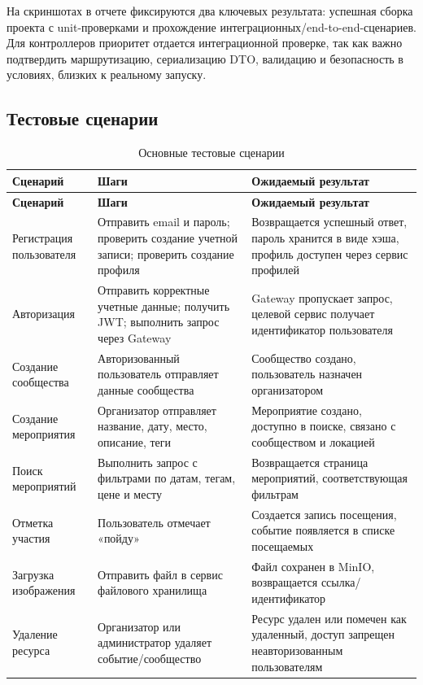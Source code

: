 На скриншотах в отчете фиксируются два ключевых результата: успешная сборка проекта с unit-проверками и прохождение интеграционных/end-to-end-сценариев. Для контроллеров приоритет отдается интеграционной проверке, так как важно подтвердить маршрутизацию, сериализацию DTO, валидацию и безопасность в условиях, близких к реальному запуску.

\subsection{Тестовые сценарии}

\begin{longtable}{|p{4cm}|p{5.5cm}|p{5.5cm}|}
\caption{Основные тестовые сценарии}\label{tab:tests}\\
\hline
\textbf{Сценарий} & \textbf{Шаги} & \textbf{Ожидаемый результат} \\
\hline
\endfirsthead
\hline
\textbf{Сценарий} & \textbf{Шаги} & \textbf{Ожидаемый результат} \\
\hline
\endhead
Регистрация пользователя & Отправить email и пароль; проверить создание учетной записи; проверить создание профиля & Возвращается успешный ответ, пароль хранится в виде хэша, профиль доступен через сервис профилей \\
\hline
Авторизация & Отправить корректные учетные данные; получить JWT; выполнить запрос через Gateway & Gateway пропускает запрос, целевой сервис получает идентификатор пользователя \\
\hline
Создание сообщества & Авторизованный пользователь отправляет данные сообщества & Сообщество создано, пользователь назначен организатором \\
\hline
Создание мероприятия & Организатор отправляет название, дату, место, описание, теги & Мероприятие создано, доступно в поиске, связано с сообществом и локацией \\
\hline
Поиск мероприятий & Выполнить запрос с фильтрами по датам, тегам, цене и месту & Возвращается страница мероприятий, соответствующая фильтрам \\
\hline
Отметка участия & Пользователь отмечает «пойду» & Создается запись посещения, событие появляется в списке посещаемых \\
\hline
Загрузка изображения & Отправить файл в сервис файлового хранилища & Файл сохранен в MinIO, возвращается ссылка/идентификатор \\
\hline
Удаление ресурса & Организатор или администратор удаляет событие/сообщество & Ресурс удален или помечен как удаленный, доступ запрещен неавторизованным пользователям \\
\hline
\end{longtable}

